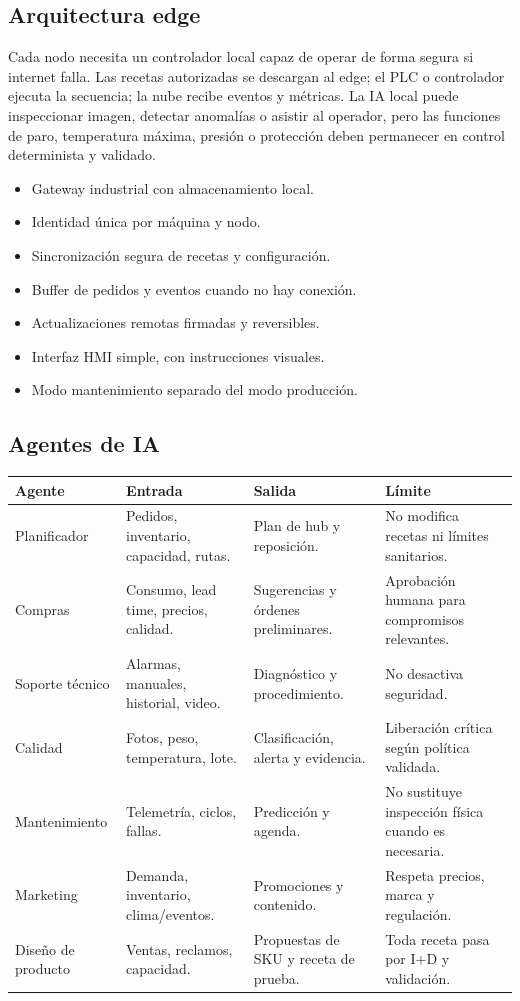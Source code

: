 \documentclass[11pt,a4paper]{article}
\begin{document}
\subsection{Arquitectura edge}
Cada nodo necesita un controlador local capaz de operar de forma segura si internet falla. Las recetas
autorizadas se descargan al edge; el PLC o controlador ejecuta la secuencia; la nube recibe eventos y
métricas. La IA local puede inspeccionar imagen, detectar anomalías o asistir al operador, pero las
funciones de paro, temperatura máxima, presión o protección deben permanecer en control determinista y
validado.
\begin{itemize}
\item Gateway industrial con almacenamiento local.
\item Identidad única por máquina y nodo.
\item Sincronización segura de recetas y configuración.
\item Buffer de pedidos y eventos cuando no hay conexión.
\item Actualizaciones remotas firmadas y reversibles.
\item Interfaz HMI simple, con instrucciones visuales.
\item Modo mantenimiento separado del modo producción.
\end{itemize}

\subsection{Agentes de IA}
{\small
\begin{xltabular}{\textwidth}{@{}P{2.4cm}LLL@{}}
\toprule
\textbf{Agente} & \textbf{Entrada} & \textbf{Salida} & \textbf{Límite}\\ \midrule
\endhead
Planificador & Pedidos, inventario, capacidad, rutas. & Plan de hub y reposición. & No modifica recetas ni límites sanitarios.\\
Compras & Consumo, lead time, precios, calidad. & Sugerencias y órdenes preliminares. & Aprobación humana para compromisos relevantes.\\
Soporte técnico & Alarmas, manuales, historial, video. & Diagnóstico y procedimiento. & No desactiva seguridad.\\
Calidad & Fotos, peso, temperatura, lote. & Clasificación, alerta y evidencia. & Liberación crítica según política validada.\\
Mantenimiento & Telemetría, ciclos, fallas. & Predicción y agenda. & No sustituye inspección física cuando es necesaria.\\
Marketing & Demanda, inventario, clima/eventos. & Promociones y contenido. & Respeta precios, marca y regulación.\\
Diseño de producto & Ventas, reclamos, capacidad. & Propuestas de SKU y receta de prueba. & Toda receta pasa por I+D y validación.\\
\bottomrule
\end{xltabular}}
\end{document}
